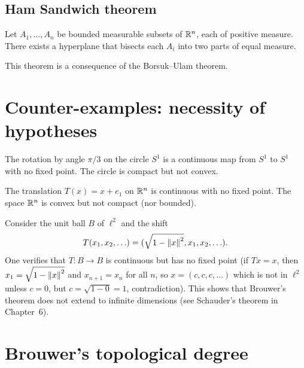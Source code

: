 \subsection{Ham Sandwich theorem}

\begin{theorem}
Let $A_1, \ldots, A_n$ be bounded measurable subsets of $\mathbb{R}^n$, each of positive
measure. There exists a hyperplane that bisects each $A_i$ into two parts of
equal measure.
\end{theorem}

\begin{remark}
This theorem is a consequence of the Borsuk--Ulam theorem.
\end{remark}

\section{Counter-examples: necessity of hypotheses}

\begin{example}
The rotation by angle $\pi/3$ on the circle $S^1$ is a continuous map from
$S^1$ to $S^1$ with no fixed point. The circle is compact but not convex.
\end{example}

\begin{example}
The translation $T(x) = x + e_1$ on $\mathbb{R}^n$ is continuous with no fixed point.
The space $\mathbb{R}^n$ is convex but not compact (nor bounded).
\end{example}

\begin{example}
Consider the unit ball $B$ of $\ell^2$ and the shift
\[
    T(x_1, x_2, \ldots) = (\sqrt{1 - \left\| x \right\|^2}, x_1, x_2, \ldots).
\]
One verifies that $T : B \to B$ is continuous but has no fixed point (if
$Tx = x$, then $x_1 = \sqrt{1 - \left\| x \right\|^2}$ and $x_{n+1} = x_n$ for all $n$,
so $x = (c, c, c, \ldots)$ which is not in $\ell^2$ unless $c = 0$, but
$c = \sqrt{1 - 0} = 1$, contradiction). This shows that Brouwer's theorem does
not extend to infinite dimensions (see Schauder's theorem in Chapter~6).
\end{example}

\section{Brouwer's topological degree}

